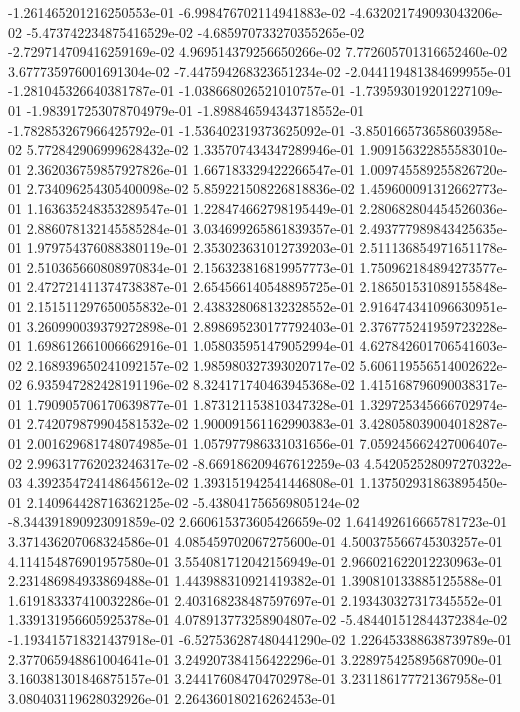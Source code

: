 -1.261465201216250553e-01
-6.998476702114941883e-02
-4.632021749093043206e-02
-5.473742234875416529e-02
-4.685970733270355265e-02
-2.729714709416259169e-02
4.969514379256650266e-02
7.772605701316652460e-02
3.677735976001691304e-02
-7.447594268323651234e-02
-2.044119481384699955e-01
-1.281045326640381787e-01
-1.038668026521010757e-01
-1.739593019201227109e-01
-1.983917253078704979e-01
-1.898846594343718552e-01
-1.782853267966425792e-01
-1.536402319373625092e-01
-3.850166573658603958e-02
5.772842906999628432e-02
1.335707434347289946e-01
1.909156322855583010e-01
2.362036759857927826e-01
1.667183329422266547e-01
1.009745589255826720e-01
2.734096254305400098e-02
5.859221508226818836e-02
1.459600091312662773e-01
1.163635248353289547e-01
1.228474662798195449e-01
2.280682804454526036e-01
2.886078132145585284e-01
3.034699265861839357e-01
2.493777989843425635e-01
1.979754376088380119e-01
2.353023631012739203e-01
2.511136854971651178e-01
2.510365660808970834e-01
2.156323816819957773e-01
1.750962184894273577e-01
2.472721411374738387e-01
2.654566140548895725e-01
2.186501531089155848e-01
2.151511297650055832e-01
2.438328068132328552e-01
2.916474341096630951e-01
3.260990039379272898e-01
2.898695230177792403e-01
2.376775241959723228e-01
1.698612661006662916e-01
1.058035951479052994e-01
4.627842601706541603e-02
2.168939650241092157e-02
1.985980327393020717e-02
5.606119556514002622e-02
6.935947282428191196e-02
8.324171740463945368e-02
1.415168796090038317e-01
1.790905706170639877e-01
1.873121153810347328e-01
1.329725345666702974e-01
2.742079879904581532e-02
1.900091561162990383e-01
3.428058039004018287e-01
2.001629681748074985e-01
1.057977986331031656e-01
7.059245662427006407e-02
2.996317762023246317e-02
-8.669186209467612259e-03
4.542052528097270322e-03
4.392354724148645612e-02
1.393151942541446808e-01
1.137502931863895450e-01
2.140964428716362125e-02
-5.438041756569805124e-02
-8.344391890923091859e-02
2.660615373605426659e-02
1.641492616665781723e-01
3.371436207068324586e-01
4.085459702067275600e-01
4.500375566745303257e-01
4.114154876901957580e-01
3.554081712042156949e-01
2.966021622012230963e-01
2.231486984933869488e-01
1.443988310921419382e-01
1.390810133885125588e-01
1.619183337410032286e-01
2.403168238487597697e-01
2.193430327317345552e-01
1.339131956605925378e-01
4.078913773258904807e-02
-5.484401512844372384e-02
-1.193415718321437918e-01
-6.527536287480441290e-02
1.226453388638739789e-01
2.377065948861004641e-01
3.249207384156422296e-01
3.228975425895687090e-01
3.160381301846875157e-01
3.244176084704702978e-01
3.231186177721367958e-01
3.080403119628032926e-01
2.264360180216262453e-01
